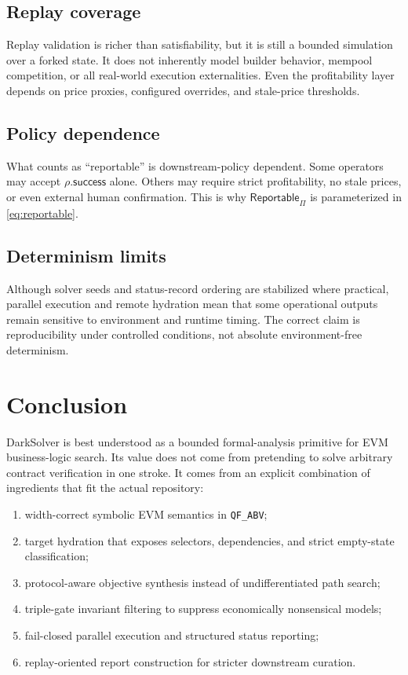 \documentclass[11pt]{article}
\numberwithin{equation}{section}
\theoremstyle{remark}
\newcommand{\QFABV}{\texttt{QF\_ABV}}
\newcommand{\Reportable}{\mathsf{Reportable}}
\begin{document}
\subsection{Replay coverage}

Replay validation is richer than satisfiability, but it is still a bounded simulation over a forked state. It does not inherently model builder behavior, mempool competition, or all real-world execution externalities. Even the profitability layer depends on price proxies, configured overrides, and stale-price thresholds.

\subsection{Policy dependence}

What counts as ``reportable'' is downstream-policy dependent. Some operators may accept \(\rho.\mathsf{success}\) alone. Others may require strict profitability, no stale prices, or even external human confirmation. This is why \(\Reportable_{\Pi}\) is parameterized in \cref{eq:reportable}.

\subsection{Determinism limits}

Although solver seeds and status-record ordering are stabilized where practical, parallel execution and remote hydration mean that some operational outputs remain sensitive to environment and runtime timing. The correct claim is reproducibility under controlled conditions, not absolute environment-free determinism.

\section{Conclusion}

DarkSolver is best understood as a bounded formal-analysis primitive for EVM business-logic search. Its value does not come from pretending to solve arbitrary contract verification in one stroke. It comes from an explicit combination of ingredients that fit the actual repository:
\begin{enumerate}[leftmargin=1.5em]
  \item width-correct symbolic EVM semantics in \QFABV{};
  \item target hydration that exposes selectors, dependencies, and strict empty-state classification;
  \item protocol-aware objective synthesis instead of undifferentiated path search;
  \item triple-gate invariant filtering to suppress economically nonsensical models;
  \item fail-closed parallel execution and structured status reporting;
  \item replay-oriented report construction for stricter downstream curation.
\end{enumerate}
\end{document}
